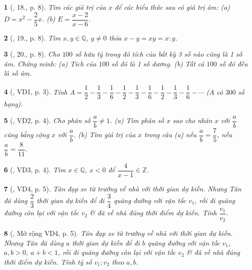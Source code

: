 \documentclass{article}
\newtheorem{baitoan}{}
\begin{document}
\begin{baitoan}[\cite{Tuyen_Toan_7}, 18., p. 8]
	Tìm các giá trị của $x$ để các biểu thức sau có giá trị âm: (a) $D = x^2 - \dfrac{2}{5}x$. (b) $E = \dfrac{x - 2}{x - 6}$.
\end{baitoan}

\begin{baitoan}[\cite{Tuyen_Toan_7}, 19., p. 8]
	Tìm $x,y\in\mathbb{Q}$, $y\ne 0$ thỏa $x - y = xy = x:y$.
\end{baitoan}

\begin{baitoan}[\cite{Tuyen_Toan_7}, 20., p. 8]
	Cho $100$ số hữu tỷ trong đó tích của bất kỳ 3 số nào cũng là 1 số âm. Chứng minh: (a) Tích của $100$ số đó là 1 số dương. (b) Tất cả $100$ số đó đều là số âm.	
\end{baitoan}

\begin{baitoan}[\cite{Binh_Toan_7_tap_1}, VD1, p. 3]
	Tính $A = \dfrac{1}{2} - \dfrac{1}{3} - \dfrac{1}{6} - \dfrac{1}{2} - \dfrac{1}{3} - \dfrac{1}{6} - \dfrac{1}{2} - \dfrac{1}{3} - \dfrac{1}{6} - \cdots$ ($A$ có $300$ số hạng).
\end{baitoan}

\begin{baitoan}[\cite{Binh_Toan_7_tap_1}, VD2, p. 4]
	Cho phân số $\dfrac{a}{b}\ne 1$.	(a) Tìm phân số $x$ sao cho nhân $x$ với $\dfrac{a}{b}$ cũng bằng cộng $x$ với $\dfrac{a}{b}$. (b) Tìm giá trị của $x$ trong câu (a) nếu $\dfrac{a}{b} = \dfrac{7}{5}$, nếu $\dfrac{a}{b} = \dfrac{8}{11}$.
\end{baitoan}

\begin{baitoan}[\cite{Binh_Toan_7_tap_1}, VD3, p. 4]
	Tìm $x\in\mathbb{Q}$, $x < 0$ để $\dfrac{4}{x - 1}\in\mathbb{Z}$.
\end{baitoan}

\begin{baitoan}[\cite{Binh_Toan_7_tap_1}, VD4, p. 5]
	Tân đạp xe từ trường về nhà với thời gian dự kiến. Nhưng Tân đã dùng $\dfrac{2}{3}$ thời gian dự kiến để đi $\dfrac{3}{4}$ quãng đường với vận tốc $v_1$, rồi đi quãng đường còn lại với vận tốc $v_2$ \& đã về nhà đúng thời điểm dự kiến. Tính $\dfrac{v_1}{v_2}$.
\end{baitoan}

\begin{baitoan}[\cite{Binh_Toan_7_tap_1}, Mở rộng VD4, p. 5]
	Tân đạp xe từ trường về nhà với thời gian dự kiến. Nhưng Tân đã dùng $a$ thời gian dự kiến để đi $b$ quãng đường với vận tốc $v_1$, $a,b > 0$, $a + b < 1$, rồi đi quãng đường còn lại với vận tốc $v_2$ \& đã về nhà đúng thời điểm dự kiến. Tính tỷ số $v_1:v_2$ theo $a,b$.
\end{baitoan}
\end{document}

